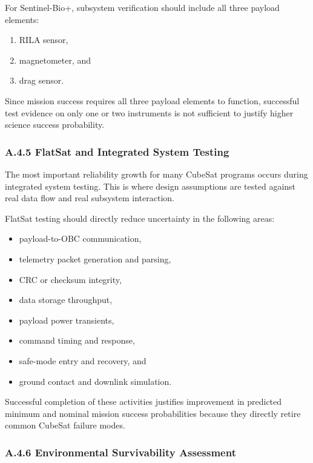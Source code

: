 \documentclass[11pt]{article}
\begin{document}
For Sentinel-Bio+, subsystem verification should include all three payload elements:

\begin{enumerate}
    \item RILA sensor,
    \item magnetometer, and
    \item drag sensor.
\end{enumerate}

Since mission success requires all three payload elements to function, successful test evidence on
only one or two instruments is not sufficient to justify higher science success probability.

\subsubsection*{A.4.5 FlatSat and Integrated System Testing}

The most important reliability growth for many CubeSat programs occurs during integrated system
testing. This is where design assumptions are tested against real data flow and real subsystem
interaction.

FlatSat testing should directly reduce uncertainty in the following areas:

\begin{itemize}
    \item payload-to-OBC communication,
    \item telemetry packet generation and parsing,
    \item CRC or checksum integrity,
    \item data storage throughput,
    \item payload power transients,
    \item command timing and response,
    \item safe-mode entry and recovery, and
    \item ground contact and downlink simulation.
\end{itemize}

Successful completion of these activities justifies improvement in predicted minimum and nominal
mission success probabilities because they directly retire common CubeSat failure modes.

\subsubsection*{A.4.6 Environmental Survivability Assessment}
\end{document}
